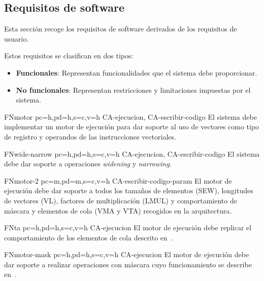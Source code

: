 \subsection{Requisitos de software}

Esta sección recoge los requisitos de software derivados de los requisitos de usuario.

Estos requisitos se clasifican en dos tipos:
\begin{itemize}
    \item \textbf{Funcionales}: Representan funcionalidades que el sistema debe proporcionar.
    \item \textbf{No funcionales}: Representan restricciones y limitaciones impuestas por el sistema.
\end{itemize}

\printsreqtemplate{}

\begin{softwareReq}{FN}{motor}
    {pc=h,pd=h,s=c,v=h}
    {CA-ejecucion, CA-escribir-codigo}
    El sistema debe implementar un motor de ejecución para dar soporte al uso de vectores como tipo de registro y operandos de las instrucciones vectoriales.
\end{softwareReq}

\begin{softwareReq}{FN}{wide-narrow}
    {pc=h,pd=h,s=c,v=h}
    {CA-ejecucion, CA-escribir-codigo}
    El sistema debe dar soporte a operaciones \textit{widening} y \textit{narrowing}.
\end{softwareReq}

\begin{softwareReq}{FN}{motor-2}
    {pc=m,pd=m,s=c,v=h}
    {CA-escribir-codigo-param}
    El motor de ejecución debe dar soporte a todos los tamaños de elementos (SEW), longitudes de vectores (VL), factores de multiplicación (LMUL) y comportamiento de máscara y elementos de cola (VMA y VTA) recogidos en la arquitectura.
\end{softwareReq}

\begin{softwareReq}{FN}{ta}
    {pc=h,pd=h,s=c,v=h}
    {CA-ejecucion}
    El motor de ejecución debe replicar el comportamiento de los elementos de cola descrito en~\cite{riscv-isa2024}.
\end{softwareReq}

\begin{softwareReq}{FN}{motor-mask}
    {pc=h,pd=h,s=c,v=h}
    {CA-ejecucion}
    El motor de ejecución debe dar soporte a realizar operaciones con máscara cuyo funcionamiento se describe en~\cite{riscv-isa2024}.
\end{softwareReq}


